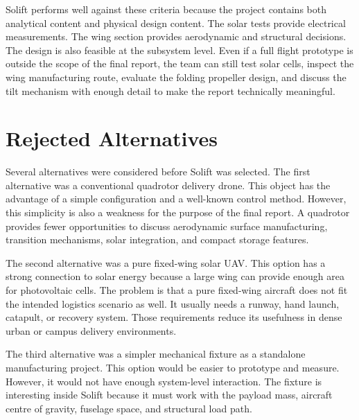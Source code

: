 Solift performs well against these criteria because the project contains both analytical content and physical design content. The solar tests provide electrical measurements. The wing section provides aerodynamic and structural decisions. The design is also feasible at the subsystem level. Even if a full flight prototype is outside the scope of the final report, the team can still test solar cells, inspect the wing manufacturing route, evaluate the folding propeller design, and discuss the tilt mechanism with enough detail to make the report technically meaningful.

\section{Rejected Alternatives}
\label{subsec:rejected-alternatives}

Several alternatives were considered before Solift was selected. The first alternative was a conventional quadrotor delivery drone. This object has the advantage of a simple configuration and a well-known control method. However, this simplicity is also a weakness for the purpose of the final report. A quadrotor provides fewer opportunities to discuss aerodynamic surface manufacturing, transition mechanisms, solar integration, and compact storage features.

The second alternative was a pure fixed-wing solar UAV. This option has a strong connection to solar energy because a large wing can provide enough area for photovoltaic cells. The problem is that a pure fixed-wing aircraft does not fit the intended logistics scenario as well. It usually needs a runway, hand launch, catapult, or recovery system. Those requirements reduce its usefulness in dense urban or campus delivery environments.

The third alternative was a simpler mechanical fixture as a standalone manufacturing project. This option would be easier to prototype and measure. However, it would not have enough system-level interaction. The fixture is interesting inside Solift because it must work with the payload mass, aircraft centre of gravity, fuselage space, and structural load path.

